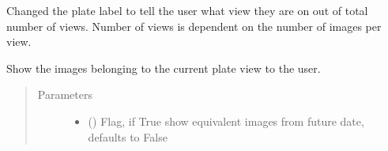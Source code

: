 \documentclass[letterpaper,10pt,english]{sphinxmanual}
\begin{document}
\begin{fulllineitems}
\begin{fulllineitems}
\label{\detokenize{polo.widgets:polo.widgets.plate_inspector_widget.PlateInspectorWidget.set_plate_label}}
Changed the plate label to tell the user what view they are on out
of total number of views. Number of views is dependent on the number
of images per view.

\end{fulllineitems}


\begin{fulllineitems}
\label{\detokenize{polo.widgets:polo.widgets.plate_inspector_widget.PlateInspectorWidget.set_time_resolved_buttons}}
\end{fulllineitems}


\begin{fulllineitems}
\label{\detokenize{polo.widgets:polo.widgets.plate_inspector_widget.PlateInspectorWidget.show_current_plate}}
Show the images belonging to the current plate view to the user.
\begin{quote}\begin{description}
\item[{Parameters}] \leavevmode\begin{itemize}
\item {} 
 (\sphinxstyleliteralemphasis{\sphinxupquote{, }}) \textendash{} Flag, if True show equivalent images from future 
date, defaults to False


\end{itemize}
\end{description}
\end{quote}
\end{fulllineitems}
\end{fulllineitems}
\end{document}
